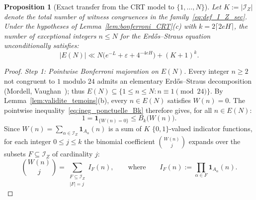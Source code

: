 \documentclass[11pt, a4paper]{article}
\theoremstyle{plain}
\newtheorem{proposition}[theorem]{Proposition}
\theoremstyle{definition}
\newcommand{\ind}{\mathbf{1}}
\begin{document}
\begin{proposition}[Exact transfer from the CRT model to $\{1,\dots,N\}$]\label{prop:transfert_exact_N}
Let $K := |\mathcal{I}_Z|$ denote the total number of witness congruences in the family~\eqref{eq:def_I_Z_sec}. Under the hypotheses of Lemma~\ref{lem:bonferroni_CRT}(c) with $k = 2\lceil 2eH \rceil$, the number of exceptional integers $n \le N$ for the Erd\H{o}s--Straus equation unconditionally satisfies:
\begin{equation}\label{eq:borne_transfert_E_N}
|E(N)| \ll N\Big(e^{-L} + \varepsilon + 4^{-4eH}\Big) + (K+1)^k.
\end{equation}
\end{proposition}
\begin{proof}
\emph{Step 1: Pointwise Bonferroni majoration on $E(N)$.}
Every integer $n \ge 2$ not congruent to $1$ modulo $24$ admits an elementary Erd\H{o}s--Straus decomposition (Mordell, Vaughan~\cite{vaughan1970}); thus $E(N) \subseteq \{1 \le n \le N : n \equiv 1 \pmod{24}\}$. By Lemma~\ref{lem:validite_temoins}(b), every $n \in E(N)$ satisfies $W(n) = 0$. The pointwise inequality~\eqref{eq:ineg_ponctuelle_Bk} therefore gives, for all $n \in E(N)$:
\[
1 = \ind_{\{W(n)=0\}} \le B_k\big(W(n)\big).
\]
Since $W(n) = \sum_{\alpha \in \mathcal{I}_Z} \ind_{A_\alpha}(n)$ is a sum of $K$ $\{0, 1\}$-valued indicator functions, for each integer $0 \le j \le k$ the binomial coefficient $\binom{W(n)}{j}$ expands over the subsets $F \subseteq \mathcal{I}_Z$ of cardinality $j$:
\[
\binom{W(n)}{j} = \sum_{\substack{F \subseteq \mathcal{I}_Z \\ |F| = j}} I_F(n), \qquad \text{where} \qquad I_F(n) := \prod_{\alpha \in F} \ind_{A_\alpha}(n).
\]


\end{proof}
\end{document}
